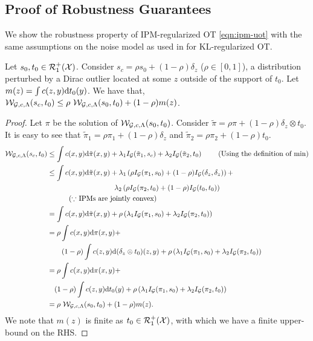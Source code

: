 \subsection{Proof of Robustness Guarantees}\label{robustness}
We show the robustness property of IPM-regularized OT \ref{eqn:ipm-uot} with the same assumptions on the noise model as used in \citet[Lemma~1]{jumbot} for KL-regularized OT.
\begin{lemmaBox}
\begin{lemma} Let $s_0, t_0\in \mathcal{R}_1^+(\mathcal{X})$. Consider $s_c = \rho s_0 + (1-\rho) \delta_z$ ($\rho\in [0, 1]$), a distribution perturbed by a Dirac outlier located at some $z$ outside of the support of $t_0$. Let $m(z)=\int c(z, y)\textup{d}t_0(y)$. \newline
We have that, $\mathcal{W}_{\mathcal{G}, c, \Lambda}(s_c, t_0)\leq \rho\ \mathcal{W}_{\mathcal{G}, c, \Lambda}(s_0, t_0) + (1-\rho) m(z)$.
\end{lemma}
\end{lemmaBox}
\begin{proof}
    Let $\pi$ be the solution of $\mathcal{W}_{\mathcal{G}, c, \Lambda}(s_0, t_0)$. Consider $\tilde{\pi} = \rho \pi + (1-\rho) \delta_z\otimes t_0$. It is easy to see that $\tilde{\pi}_1 = \rho \pi_1 + (1-\rho) \delta_z$ and $\tilde{\pi}_2 = \rho \pi_2 + (1-\rho) t_0$.
    \begin{align*}
        \mathcal{W}_{\mathcal{G}, c, \Lambda}(s_c, t_0) &\leq \int c(x, y) \textup{d}\tilde{\pi}(x, y) + \lambda_1   I_{\mathcal{G}}(\tilde{\pi}_1, s_c) + \lambda_2  I_{\mathcal{G}}(\tilde{\pi}_2, t_0) \ \tag{Using the definition of min}\\
        &\leq \int c(x, y) \textup{d}\tilde{\pi}(x, y) + \lambda_1\left(\rho  I_{\mathcal{G}}(\pi_1, s_0) + (1-\rho)  I_{\mathcal{G}}(\delta_z, \delta_z) \right) + \\&\qquad\qquad\qquad\qquad\quad ~\lambda_2\left(\rho  I_{\mathcal{G}}(\pi_2, t_0) + (1-\rho)  I_{\mathcal{G}}(t_0, t_0)\right)\\
        & \quad \tag{$\because$ IPMs are jointly convex}
        \\
        &= \int c(x, y) \textup{d}\tilde{\pi}(x, y) + \rho \left(\lambda_1  I_{\mathcal{G}}(\pi_1, s_0) + \lambda_2  I_{\mathcal{G}}(\pi_2, t_0)\right)\\
        & = \rho\int c(x, y) \textup{d}\pi(x, y) +\\&
        \qquad (1-\rho)\int  c(z, y) \textup{d}(\delta_z\otimes t_0)(z, y)+ \rho\left(\lambda_1   I_{\mathcal{G}}(\pi_1, s_0) + \lambda_2  I_{\mathcal{G}}(\pi_2, t_0)\right)\\
        & = \rho\int c(x, y) \textup{d}\pi(x, y) +\\ &\quad  (1-\rho)\int c(z, y) \textup{d}t_0(y)+  \rho\left(\lambda_1   I_{\mathcal{G}}(\pi_1, s_0) + \lambda_2  I_{\mathcal{G}}(\pi_2, t_0)\right)\\
        & = \rho \ \mathcal{W}_{\mathcal{G}, c, \Lambda}(s_0, t_0) + (1-\rho) m(z).
    \end{align*}
We note that $m(z)$ is finite as $t_0\in \mathcal{R}_1^+(\mathcal{X})$, with which we have a finite upper-bound on the RHS.
\end{proof}
